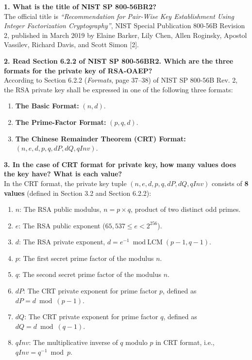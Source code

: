 \documentclass[10pt,twocolumn,letterpaper]{article}
\begin{document}
\noindent\textbf{1. What is the title of NIST SP 800-56BR2?} \\
The official title is \textit{``Recommendation for Pair-Wise Key Establishment Using Integer Factorization Cryptography''}, NIST Special Publication 800-56B Revision 2, published in March 2019 by Elaine Barker, Lily Chen, Allen Roginsky, Apostol Vassilev, Richard Davis, and Scott Simon [2].

\vspace{0.5em}
\noindent\textbf{2. Read Section 6.2.2 of NIST SP 800-56BR2. Which are the three formats for the private key of RSA-OAEP?} \\
According to Section 6.2.2 (\textit{Formats}, page 37--38) of NIST SP 800-56B Rev. 2, the RSA private key shall be expressed in one of the following three formats:
\begin{enumerate}
    \item \textbf{The Basic Format:} $(n, d)$.
    \item \textbf{The Prime-Factor Format:} $(p, q, d)$.
    \item \textbf{The Chinese Remainder Theorem (CRT) Format:} $(n, e, d, p, q, dP, dQ, qInv)$.
\end{enumerate}

\vspace{0.5em}
\noindent\textbf{3. In the case of CRT format for private key, how many values does the key have? What is each value?} \\
In the CRT format, the private key tuple $(n, e, d, p, q, dP, dQ, qInv)$ consists of \textbf{8 values} (defined in Section 3.2 and Section 6.2.2):
\begin{enumerate}
    \item $n$: The RSA public modulus, $n = p \times q$, product of two distinct odd primes.
    \item $e$: The RSA public exponent ($65,537 \le e < 2^{256}$).
    \item $d$: The RSA private exponent, $d = e^{-1} \bmod \text{LCM}(p-1, q-1)$.
    \item $p$: The first secret prime factor of the modulus $n$.
    \item $q$: The second secret prime factor of the modulus $n$.
    \item $dP$: The CRT private exponent for prime factor $p$, defined as $dP = d \bmod (p - 1)$.
    \item $dQ$: The CRT private exponent for prime factor $q$, defined as $dQ = d \bmod (q - 1)$.
    \item $qInv$: The multiplicative inverse of $q$ modulo $p$ in CRT format, i.e., $qInv = q^{-1} \bmod p$.
\end{enumerate}
\end{document}
